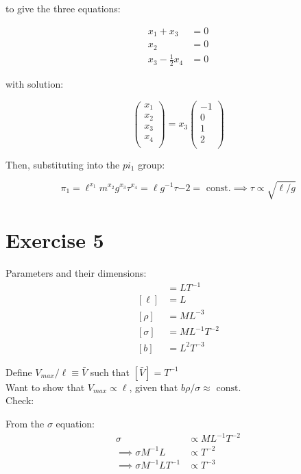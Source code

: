 \documentclass{article}
\begin{document}
to give the three equations:

\begin{align}
x_1 + x_3 &= 0 \\
x_2 &= 0 \\
x_3 - \frac{1}{2} x_4 &= 0 
\end{align}

with solution:

\begin{equation}
\begin{pmatrix}
x_1\\
x_2\\
x_3\\
x_4\\
\end{pmatrix}
= x_3
\begin{pmatrix}
-1\\
0\\
1\\
2\\
\end{pmatrix}
\end{equation}

Then, substituting into the $pi_1$ group:

\begin{equation}
\pi_1 = \ell^{x_1} m^{x_2} g^{x_3} \tau^{x_4} = \ell g^{-1} \tau{-2} = \text{ const.} \implies \tau \propto \sqrt{\ell/g} 
\end{equation}

\section{Exercise 5}

Parameters and their dimensions: \begin{align}
[V_{max}] &= LT^{-1}\\
[\ell] &= L \\
[\rho] &= ML^{-3} \\
[\sigma] &= ML^{-1}T^{-2} \\
[b] &= L^2T^{-3}
\end{align}

Define $V_{max}/\ell \equiv \bar{V}$ such that $[\bar{V}] = T^{-1}$ \\

Want to show that $V_{max} \propto \ell$, given that $b\rho/\sigma \approx \text{ const.}$ \\

Check: 

From the $\sigma$ equation:
\begin{align}
\sigma &\propto ML^{-1}T^{-2} \\
\implies \sigma M^{-1} L &\propto T^{-2}\\
\implies \sigma M^{-1} L T^{-1} &\propto T^{-3} 
\end{align}
\end{document}
